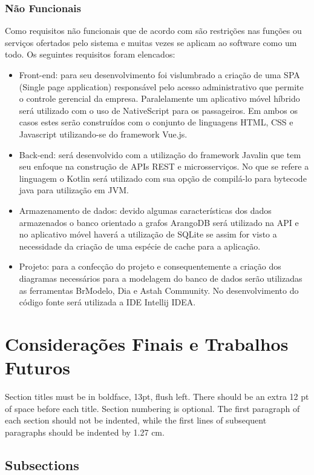 \documentclass[12pt]{article}
\begin{document}
\subsubsection{Não Funcionais}
Como requisitos não funcionais que de acordo com \cite{sommervile:2016} são restrições nas funções ou serviços ofertados pelo sistema e muitas vezes se aplicam ao software como um todo. Os seguintes requisitos foram elencados:
\begin{itemize}
	\item Front-end: para seu desenvolvimento foi vislumbrado a criação de uma SPA (Single page application) responsável pelo acesso administrativo que permite o controle gerencial da empresa. Paralelamente um aplicativo móvel híbrido será utilizado com o uso de NativeScript para os passageiros. Em ambos os casos estes serão construídos com o conjunto de linguagens HTML, CSS e Javascript utilizando-se do framework Vue.js.
	\item Back-end: será desenvolvido com a utilização do framework Javalin que tem seu enfoque na construção de APIs REST e microsserviços. No que se refere a linguagem o Kotlin será utilizado com sua opção de compilá-lo para bytecode java para utilização em JVM.
	\item Armazenamento de dados: devido algumas características dos dados armazenados o banco orientado a grafos ArangoDB será utilizado na API e no aplicativo móvel haverá a utilização de SQLite se assim for visto a necessidade da criação de uma espécie de cache para a aplicação.
	\item Projeto: para a confecção do projeto e consequentemente a criação dos diagramas necessários para a modelagem do banco de dados serão utilizadas as ferramentas BrModelo, Dia e Astah Community. No desenvolvimento do código fonte será utilizada a IDE Intellij IDEA.
\end{itemize}

\section{Considerações Finais e Trabalhos Futuros}

Section titles must be in boldface, 13pt, flush left. There should be an extra
12 pt of space before each title. Section numbering is optional. The first
paragraph of each section should not be indented, while the first lines of
subsequent paragraphs should be indented by 1.27 cm.

\subsection{Subsections}
\end{document}
